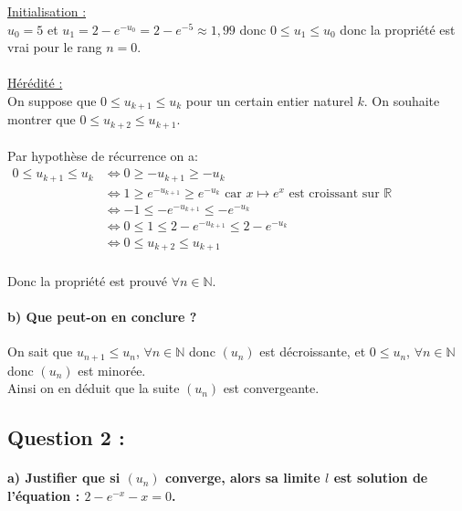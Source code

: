 \documentclass[a4paper, 12pt]{article}
\begin{document}
\underline{Initialisation :}
\\
$u_0 = 5$ et $u_1 = 2 - e^{-u_0} = 2 - e^{-5} \approx 1,99$ donc $0 \leq u_1 \leq u_0$ donc la propriété est vrai pour le rang $n = 0$.
\\
\\
\underline{Hérédité :}
\\
On suppose que $0 \leq u_{k+1} \leq u_k$ pour un certain entier naturel $k$. On souhaite montrer que $0 \leq u_{k+2} \leq u_{k+1}$.
\\ \\
Par hypothèse de récurrence on a:
\\
$ \begin{aligned}
0 \leq u_{k+1} \leq u_k 
&\iff 0 \geq -u_{k+1} \geq -u_{k} \\
&\iff 1 \geq e^{-u_{k+1}} \geq e^{-u_k} \text{ car } x \mapsto e^x \text{ est croissant sur } \mathds{R} \\
&\iff -1 \leq - e^{-u_{k+1}} \leq - e^{-u_k} \\
&\iff 0 \leq 1 \leq 2 - e^{-u_{k+1}} \leq 2 - e^{-u_k} \\
&\iff 0 \leq u_{k+2} \leq u_{k+1} 
\end{aligned}$
\\ \\
Donc la propriété est prouvé $\forall n \in \mathds{N}$.

{}
\paragraph*{b) Que peut-on en conclure ?\\[5mm]}

On sait que $u_{n+1} \leq u_n$, $\forall n \in \mathds{N}$ donc $(u_n)$ est décroissante, et $0 \leq u_n$, $\forall n \in \mathds{N}$ donc $(u_n)$ est minorée. 
\\
Ainsi on en déduit que la suite $(u_n)$ est convergeante.

{}
\subsection*{Question 2 :}

{}
\paragraph*{a) Justifier que si $(u_n)$ converge, alors sa limite $l$ est solution de l'équation : $2 - e^{-x}-x=0$.\\[5mm]}
\end{document}
